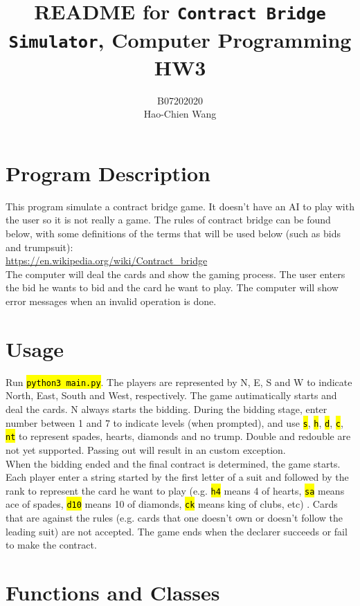 \documentclass[12pt]{article}
\title{README for \texttt{Contract Bridge Simulator}, Computer Programming HW3}
\author{B07202020\\Hao-Chien Wang}
\newcommand{\code}[1]{\texttt{\hl{#1}}}
\begin{document}
\maketitle

\section{Program Description}%
\label{sec:program_description}

This program simulate a contract bridge game. It doesn't have an AI to play with
the user so it is not really a game. The rules of contract bridge can be found
below, with some definitions of the terms that will be used below (such as 
bids and trumpsuit):\\

\url{https://en.wikipedia.org/wiki/Contract_bridge}  \\

The computer will deal the cards and show the gaming process. The user enters
the bid he wants to bid and the card he want to play. The computer will show
error messages when an invalid operation is done.


\section{Usage}%
\label{sec:usage}
Run \code{python3 main.py}. The players are represented by N, E, S and W to
indicate North, East, South and West, respectively. The game autimatically starts
and deal the cards. N always starts the bidding. During the bidding stage, enter
number between 1 and 7 to indicate levels (when prompted), and use \code{s},
\code{h}, \code{d}, \code{c}, \code{nt} to represent spades, hearts, diamonds
and no trump. Double and redouble are not yet supported. Passing out will
result in an custom exception.\\
\indent When the bidding ended and the final contract is determined, the game
starts. Each player enter a string started by the first letter of a suit and 
followed by the rank to represent the card he want to play (e.g. \code{h4} means
4 of hearts, \code{sa} means ace of spades, \code{d10} means 10 of diamonds,
\code{ck} means king of clubs, etc) . Cards that are
against the rules (e.g. cards that one doesn't own or doesn't follow the leading
suit) are not accepted. The game ends when the declarer succeeds or fail to make
the contract.


\section{Functions and Classes}%
\label{sec:classes}
\end{document}
